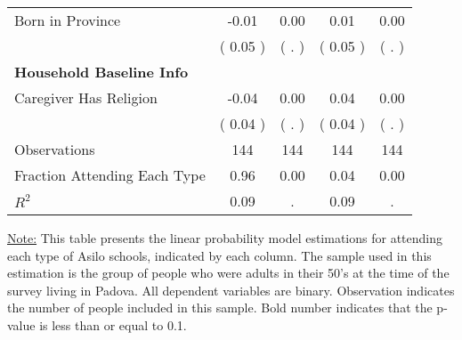 \begin{table}[H]
{\begin{tabular}{lcccc}
\quad Born in Province &     -0.01 &      0.00 &      0.01 &      0.00 \\
\quad  & (     0.05 ) & (        . )  & (     0.05 )  & (        . )  \\
\midrule
\textbf{Household Baseline Info} \\
\quad Caregiver Has Religion &     -0.04 &      0.00 &      0.04 &      0.00 \\
\quad  & (     0.04 ) & (        . )  & (     0.04 )  & (        . )  \\
\midrule
Observations & 144 & 144 & 144 & 144 \\
Fraction Attending Each Type &      0.96 &      0.00 &      0.04 &      0.00 \\
\midrule
$ R^2$ &      0.09 &         . &      0.09 &         . \\
\bottomrule
\end{tabular}}
\end{table}
\begin{footnotesize}
\noindent\underline{Note:} This table presents the linear probability model estimations for attending each type of Asilo schools, indicated by each column. The sample used in this estimation is the group of people who were adults in their 50's at the time of the survey living in Padova. All dependent variables are binary. Observation indicates the number of people included in this sample. Bold number indicates that the p-value is less than or equal to 0.1.
\end{footnotesize}
